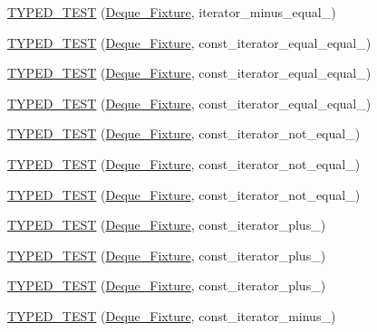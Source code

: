 \begin{DoxyCompactItemize}
\item 
\hyperlink{TestDeque_8c_09_09_ac8caeba5596c2674f5ab59fb423c5125}{T\-Y\-P\-E\-D\-\_\-\-T\-E\-S\-T} (\hyperlink{structDeque__Fixture}{Deque\-\_\-\-Fixture}, iterator\-\_\-minus\-\_\-equal\-\_)
\item 
\hyperlink{TestDeque_8c_09_09_a61a3ccd7ad7ac5b2117daad0f3d600ae}{T\-Y\-P\-E\-D\-\_\-\-T\-E\-S\-T} (\hyperlink{structDeque__Fixture}{Deque\-\_\-\-Fixture}, const\-\_\-iterator\-\_\-equal\-\_\-equal\-\_)
\item 
\hyperlink{TestDeque_8c_09_09_a7d32ec8f0d6903a0ff1d29a09a787e9c}{T\-Y\-P\-E\-D\-\_\-\-T\-E\-S\-T} (\hyperlink{structDeque__Fixture}{Deque\-\_\-\-Fixture}, const\-\_\-iterator\-\_\-equal\-\_\-equal\-\_)
\item 
\hyperlink{TestDeque_8c_09_09_ad86c6a0801475eb5a7b179ffa84b39a2}{T\-Y\-P\-E\-D\-\_\-\-T\-E\-S\-T} (\hyperlink{structDeque__Fixture}{Deque\-\_\-\-Fixture}, const\-\_\-iterator\-\_\-equal\-\_\-equal\-\_)
\item 
\hyperlink{TestDeque_8c_09_09_a39402a17542a92f7c1a7917d8d66a7ec}{T\-Y\-P\-E\-D\-\_\-\-T\-E\-S\-T} (\hyperlink{structDeque__Fixture}{Deque\-\_\-\-Fixture}, const\-\_\-iterator\-\_\-not\-\_\-equal\-\_)
\item 
\hyperlink{TestDeque_8c_09_09_a9865e684918d592785a8b6fca6a63060}{T\-Y\-P\-E\-D\-\_\-\-T\-E\-S\-T} (\hyperlink{structDeque__Fixture}{Deque\-\_\-\-Fixture}, const\-\_\-iterator\-\_\-not\-\_\-equal\-\_)
\item 
\hyperlink{TestDeque_8c_09_09_a4f32679b52d4f2a7e436d34cae5e5800}{T\-Y\-P\-E\-D\-\_\-\-T\-E\-S\-T} (\hyperlink{structDeque__Fixture}{Deque\-\_\-\-Fixture}, const\-\_\-iterator\-\_\-not\-\_\-equal\-\_)
\item 
\hyperlink{TestDeque_8c_09_09_a42a9aabfca4a1e46e58c03d56dc15d8f}{T\-Y\-P\-E\-D\-\_\-\-T\-E\-S\-T} (\hyperlink{structDeque__Fixture}{Deque\-\_\-\-Fixture}, const\-\_\-iterator\-\_\-plus\-\_)
\item 
\hyperlink{TestDeque_8c_09_09_a284dd9ae125e6e021583c42fe195da5f}{T\-Y\-P\-E\-D\-\_\-\-T\-E\-S\-T} (\hyperlink{structDeque__Fixture}{Deque\-\_\-\-Fixture}, const\-\_\-iterator\-\_\-plus\-\_)
\item 
\hyperlink{TestDeque_8c_09_09_a10453a7486a562e2e3bf5ae763f022ff}{T\-Y\-P\-E\-D\-\_\-\-T\-E\-S\-T} (\hyperlink{structDeque__Fixture}{Deque\-\_\-\-Fixture}, const\-\_\-iterator\-\_\-plus\-\_)
\item 
\hyperlink{TestDeque_8c_09_09_a1bafd8f5173309d1ba19abe5c877b12d}{T\-Y\-P\-E\-D\-\_\-\-T\-E\-S\-T} (\hyperlink{structDeque__Fixture}{Deque\-\_\-\-Fixture}, const\-\_\-iterator\-\_\-minus\-\_)

\end{DoxyCompactItemize}
